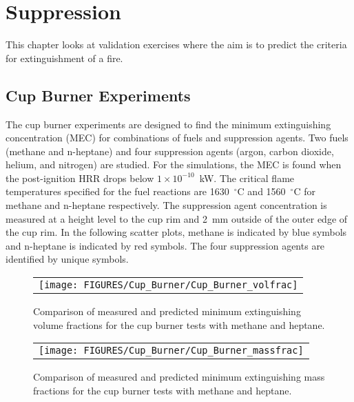 
\chapter{Suppression}

This chapter looks at validation exercises where the aim is to predict the criteria for extinguishment of a fire.

\section{Cup Burner Experiments}

The cup burner experiments are designed to find the minimum extinguishing concentration (MEC) for combinations of fuels and suppression agents. Two fuels (methane and n-heptane) and four suppression agents (argon, carbon dioxide, helium, and nitrogen) are studied. For the simulations, the MEC is found when the post-ignition HRR drops below $1 \times 10^{-10}$~kW. The critical flame temperatures specified for the fuel reactions are 1630~$^\circ$C and 1560~$^\circ$C for methane and n-heptane respectively. The suppression agent concentration is measured at a height level to the cup rim and 2~mm outside of the outer edge of the cup rim. In the following scatter plots, methane is indicated by blue symbols and n-heptane is indicated by red symbols. The four suppression agents are identified by unique symbols.

\newpage

\begin{figure}[h!]
\begin{center}
\begin{tabular}{c}
\texttt{[image: FIGURES/Cup\_Burner/Cup\_Burner\_volfrac]}
\end{tabular}
\end{center}
\label{cup_burner_extinguish_vol}
\caption[Comparison of measured and predicted minimum extinguishing concentrations for the cup burner tests with methane and heptane]{Comparison of measured and predicted minimum extinguishing volume fractions for the cup burner tests with methane and heptane.}
\end{figure}


\begin{figure}[h!]
\begin{center}
\begin{tabular}{c}
\texttt{[image: FIGURES/Cup\_Burner/Cup\_Burner\_massfrac]}
\end{tabular}
\end{center}
\label{cup_burner_extinguish_mass}
\caption[Comparison of measured and predicted minimum extinguishing concentrations for the cup burner tests with methane and heptane]{Comparison of measured and predicted minimum extinguishing mass fractions for the cup burner tests with methane and heptane.}
\end{figure}

